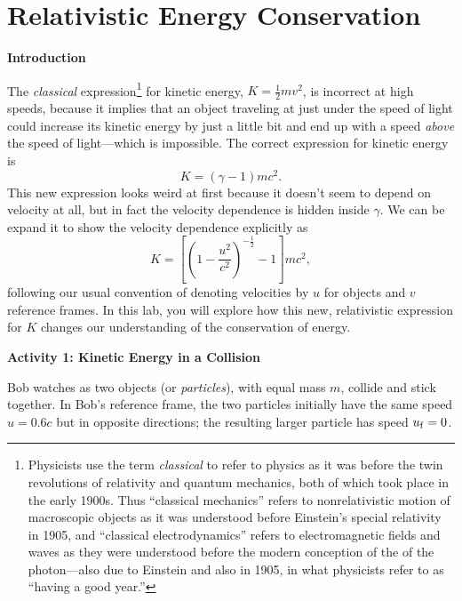 \section{Relativistic Energy Conservation}

\makelabheader %

\bigskip
\vspace{\fill}

\textbf{Introduction}

The \textit{classical} expression\footnote{Physicists use the term \textit{classical} to refer to physics as it was before the twin revolutions of relativity and quantum mechanics, both of which 
took place in the early 1900s.  Thus ``classical mechanics'' refers to nonrelativistic motion of macroscopic objects as it was understood before Einstein's special relativity in 1905, and ``classical electrodynamics'' refers to electromagnetic fields and waves as they were understood before the modern conception of the of the photon---also due to Einstein and also in 1905, in what physicists refer to as ``having a good year.''
}
for kinetic energy, $K=\frac{1}{2}mv^2$, is incorrect at high speeds, because it implies that an object traveling at just under the speed of light could  increase its kinetic energy by just a little bit and end up with a speed \textit{above} the speed of light---which is impossible.  The correct expression for kinetic energy is
\begin{equation}
K=(\gamma -1)mc^2.
\label{eq:K_relativistic}
\end{equation}
This new expression looks weird at first because it doesn't seem to depend on velocity at all, but in fact the velocity dependence is hidden inside $\gamma$.  We can be expand it to show the velocity dependence explicitly as 
\begin{equation}
K=\left[ \left(1 - \frac{u^2}{c^2} \right)^{-\frac{1}{2}} - 1 \right]mc^2,
\end{equation}
following our usual convention of denoting velocities by $u$ for objects and $v$ reference frames. 
In this lab, you will
explore how this new, relativistic expression for $K$ changes our understanding of the conservation of energy.

\bigskip

\textbf{Activity 1: Kinetic Energy in a Collision}

Bob watches as two objects (or \textit{particles}), with equal mass $m$, collide and stick together.  In Bob's reference frame, the two particles initially have the same speed $u=0.6c$ but in opposite directions; the resulting larger particle has speed $u_{\rm f}=0$.

